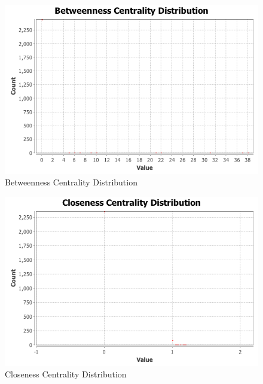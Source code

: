 \documentclass{article}
\begin{document}
\begin{figure}[H]
\centering
\includegraphics[scale=0.70]{q3/GraphDistanceReport/BetweennessCentralityDistribution}
\caption{Betweenness Centrality Distribution}
\label{businesscentrality}
\end{figure}

\begin{figure}[H]
\centering
\includegraphics[scale=0.70]{q3/GraphDistanceReport/ClosenessCentralityDistribution}
\caption{Closeness Centrality Distribution}
\label{closeness centrality}
\end{figure}
\end{document}
